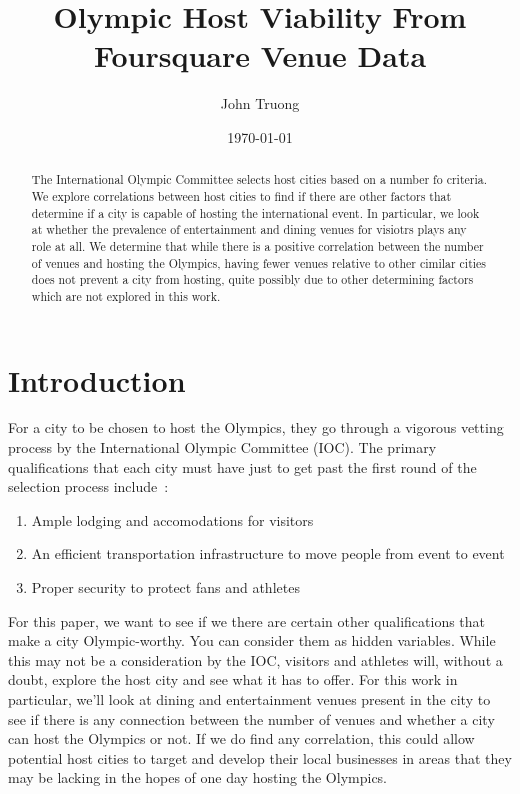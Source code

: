 \documentclass[
 reprint,
 amsmath,amssymb,
 aps,
prb,
floatfix
]{revtex4-2}
\begin{document}

\title{Olympic Host Viability From Foursquare Venue Data}

\author{John Truong}

\date{\today}

\begin{abstract}
    The International Olympic Committee selects host cities based on a number fo criteria. We explore correlations between host cities to find if there are other factors that determine if a city is capable of hosting the international event. In particular, we look at whether the prevalence of entertainment and dining venues for visiotrs plays any role at all. We determine that while there is a positive correlation between the number of venues and hosting the Olympics, having fewer venues relative to other cimilar cities does not prevent a city from hosting, quite possibly due to other determining factors which are not explored in this work.
\end{abstract}

\maketitle

\section{Introduction}
    For a city to be chosen to host the Olympics, they go through a vigorous vetting process by the International Olympic Committee (IOC). The primary qualifications that each city must have just to get past the first round of the selection process include~\cite{chepkemoi_how_2018}:
    \begin{enumerate}
        \item Ample lodging and accomodations for visitors
        \item An efficient transportation infrastructure to move people from event to event
        \item Proper security to protect fans and athletes
    \end{enumerate}
    For this paper, we want to see if we there are certain other qualifications that make a city Olympic-worthy. You can consider them as hidden variables. While this may not be a consideration by the IOC, visitors and athletes will, without a doubt, explore the host city and see what it has to offer. For this work in particular, we'll look at dining and entertainment venues present in the city to see if there is any connection between the number of venues and whether a city can host the Olympics or not. If we do find any correlation, this could  allow potential host cities to target and develop their local businesses in areas that they may be lacking in the hopes of one day hosting the Olympics.
\end{document}
